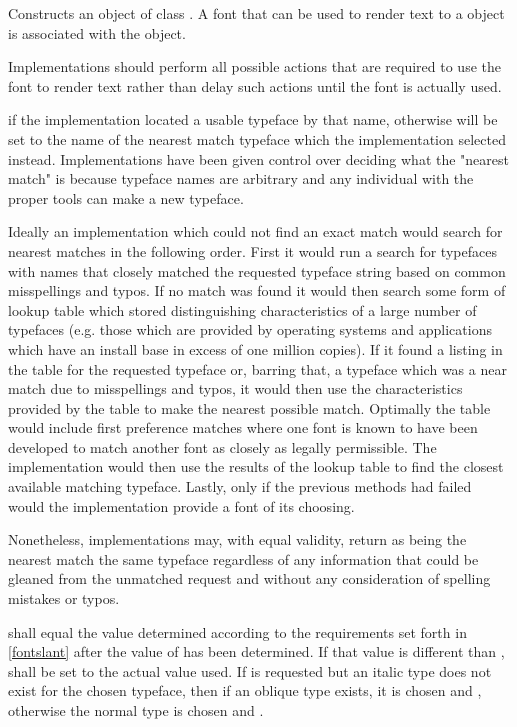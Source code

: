 \begin{itemdescr}
	\pnum
	\effects
	Constructs an object of class . A font that can be used to render text to a  object is associated with the object.
	
	\pnum
	Implementations should perform all possible actions that are required to use the font to render text rather than delay such actions until the font is actually used.
	
	\pnum
	\postconditions
	 if the implementation located a usable typeface by that name, otherwise  will be set to the name of the  nearest match typeface which the implementation selected instead.
	\enternote
	Implementations have been given control over deciding what the "nearest match" is because typeface names are arbitrary and any individual with the proper tools can make a new typeface.
	
	Ideally an implementation which could not find an exact match would search for nearest matches in the following order. First it would run a search for typefaces with names that closely matched the requested typeface string based on common misspellings and typos. If no match was found it would then search some form of lookup table which stored distinguishing characteristics of a large number of typefaces (e.g. those which are provided by operating systems and applications which have an install base in excess of one million copies). If it found a listing in the table for the requested typeface or, barring that, a typeface which was a near match due to misspellings and typos, it would then use the characteristics provided by the table to make the nearest possible match. Optimally the table would include first preference matches where one font is known to have been developed to match another font as closely as legally permissible. The implementation would then use the results of the lookup table to find the closest available matching typeface. Lastly, only if the previous methods had failed would the implementation provide a font of its choosing.
	
	Nonetheless, implementations may, with equal validity, return as being the nearest match the same typeface regardless of any information that could be gleaned from the unmatched request and without any consideration of spelling mistakes or typos.
	\exitnote
	
	\pnum
	 shall equal the value determined according to the requirements set forth in \ref{fontslant} after the value of  has been determined. If that  value is different than ,  shall be set to the actual value used.
	\enterexample
	If  is requested but an italic type does not exist for the chosen typeface, then if an oblique type exists, it is chosen and , otherwise the normal type is chosen and .
	\exitexample
	

\end{itemdescr}
